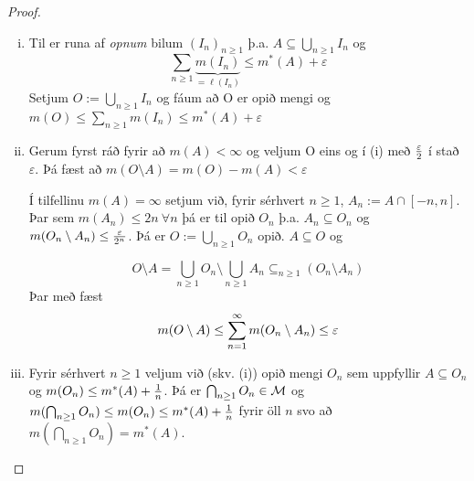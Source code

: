 \documentclass[12pt]{book} \usepackage[utf8]{inputenc}
\begin{document}
        \begin{proof}
          \begin{enumerate}[(i)]
          \item Til er runa af \emph{opnum} bilum
            $(I_n)_{n \geq 1}$ þ.a.
            $A \subseteq \bigcup_{n \geq 1} I_n$ og
            \[ \sum_{n \geq 1} \underbrace{m(I_n)}_{= \ell(I_n)}
            \leq m^*(A) + \varepsilon \]
            Setjum $O := \bigcup_{n \geq 1} I_n$ og fáum að O er
            opið mengi og
            $ m(O) \leq \sum_{n \geq 1} m(I_n) \leq m^*(A) +
            \varepsilon$
          \item Gerum fyrst ráð fyrir að $m(A) < \infty$ og veljum
            O eins og í (i) með $\frac{\varepsilon}{2}$ í stað
            $\varepsilon$.  Þá fæst að
            $m(O \setminus A) = m(O) - m(A) < \varepsilon$

            Í tilfellinu $m(A) = \infty$ setjum við, fyrir
            sérhvert $n \geq 1$, $A_n := A \cap [-n,n]$.  Þar sem
            $m(A_n) \leq 2 n \: \forall n$ þá er til opið $O_n$
            þ.a. $A_n \subseteq O_n$ og
            $m(O_n \setminus A_n) \leq \frac{\varepsilon}{2^n}$.  Þá
            er $O := \bigcup_{n \geq 1} O_n$ opið.
            $A \subseteq O$ og

            \[O \setminus A = \bigcup_{n \geq 1} O_n \setminus
            \bigcup_{n \geq 1} A_n \subseteq_{n \geq 1} (O_n
            \setminus A_n)\]
            Þar með fæst
            \[ m(O \setminus A) \leq \sum_{n = 1}^{\infty} m(O_n \setminus
            A_n) \leq \varepsilon \]

          \item Fyrir sérhvert $n \geq 1$ veljum við (skv. (i))
            opið mengi $O_n$ sem uppfyllir $A \subseteq O_n$ og
            $m(O_n) \leq m^*(A) + \frac{1}{n}$. Þá er
            $\bigcap_{n\geq 1} O_n \in \mathcal{M}$ og
            $m(\bigcap_{n\geq 1} O_n) \leq m(O_n) \leq m^*(A) +
            \frac{1}{n} $
            fyrir öll $n$ svo að
            $m(\bigcap_{n \geq 1} O_n) = m^*(A)$.

          \end{enumerate}
        \end{proof}

        \subsection{}
\end{document}
